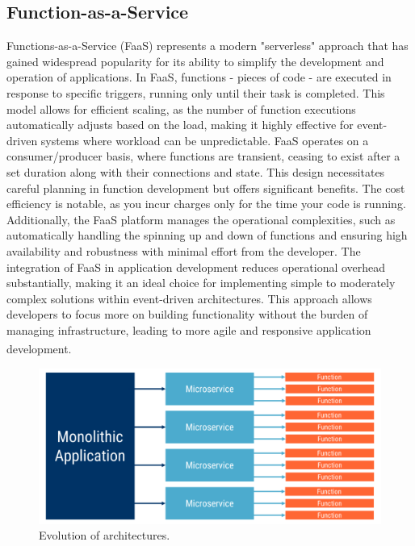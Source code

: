 \subsection{Function-as-a-Service}
Functions-as-a-Service (FaaS) represents a modern "serverless" approach that has gained widespread
popularity for its ability to simplify the development and operation of applications. In FaaS,
functions - pieces of code - are executed in response to specific triggers, running only until their
task is completed. This model allows for efficient scaling, as the number of function executions
automatically adjusts based on the load, making it highly effective for event-driven systems where
workload can be unpredictable.\newline\newline
FaaS operates on a consumer/producer basis, where functions are transient, ceasing to exist after a
set duration along with their connections and state. This design necessitates careful planning in
function development but offers significant benefits. The cost efficiency is notable, as you incur
charges only for the time your code is running. Additionally, the FaaS platform manages the
operational complexities, such as automatically handling the spinning up and down of functions and
ensuring high availability and robustness with minimal effort from the developer.\newline\newline
The integration of FaaS in application development reduces operational overhead substantially,
making it an ideal choice for implementing simple to moderately complex solutions within
event-driven architectures. This approach allows developers to focus more on building functionality
without the burden of managing infrastructure, leading to more agile and responsive application
development\textsuperscript{\cite{event_book}}.

\begin{figure}
    \centering
    \includegraphics[scale=0.5]{Pictures/3_faas.png}
    \caption{Evolution of architectures.}%
    \label{fig:3_faas}
\end{figure}

